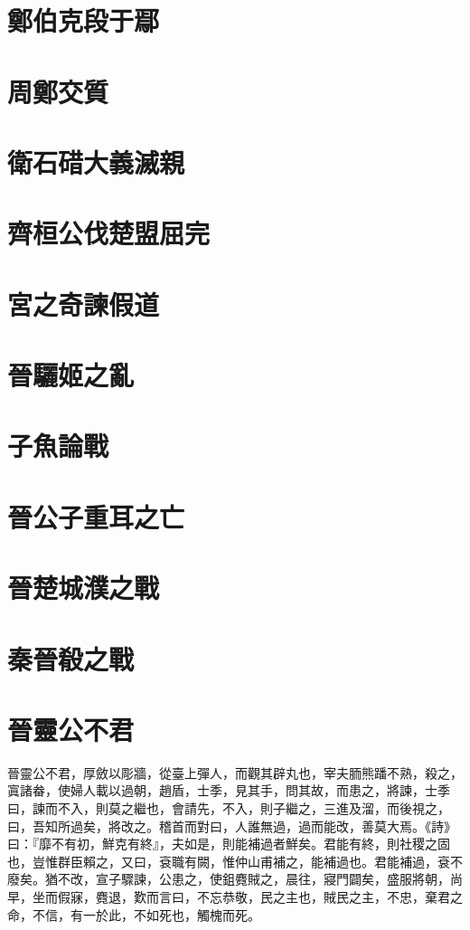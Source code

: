\documentclass{article}
\date{}
\begin{document}
\makecover
\tableofcontents

\section{鄭伯克段于鄢}

\section{周鄭交質}

\section{衛石碏大義滅親}

\section{齊桓公伐楚盟屈完}

\section{宮之奇諫假道}

\section{晉驪姬之亂}

\section{子魚論戰}

\section{晉公子重耳之亡}

\section{晉楚城濮之戰}

\section{秦晉殽之戰}

\section{晉靈公不君}

晉靈公不君，厚斂以彫牆，從臺上彈人，而觀其辟丸也，宰夫胹熊蹯不熟，殺之，寘諸畚，使婦人載以過朝，趙盾，士季，見其手，問其故，而患之，將諫，士季曰，諫而不入，則莫之繼也，會請先，不入，則子繼之，三進及溜，而後視之，曰，吾知所過矣，將改之。稽首而對曰，人誰無過，過而能改，善莫大焉。《詩》曰：『靡不有初，鮮克有終』，夫如是，則能補過者鮮矣。君能有終，則社稷之固也，豈惟群臣賴之，又曰，袞職有闕，惟仲山甫補之，能補過也。君能補過，袞不廢矣。猶不改，宣子驟諫，公患之，使鉏麑賊之，晨往，寢門闢矣，盛服將朝，尚早，坐而假寐，麑退，歎而言曰，不忘恭敬，民之主也，賊民之主，不忠，棄君之命，不信，有一於此，不如死也，觸槐而死。
\end{document}
